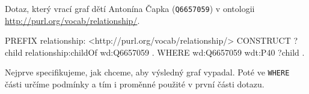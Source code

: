 \begin{prikl}
Dotaz, který vrací graf dětí Antonína Čapka (\texttt{Q6657059}) v ontologii \url{http://purl.org/vocab/relationship/}.
\begin{code}
PREFIX relationship: <http://purl.org/vocab/relationship/>
CONSTRUCT {
    ?child relationship:childOf wd:Q6657059 .
} WHERE {
    wd:Q6657059 wdt:P40 ?child .
}
\end{code}
Nejprve specifikujeme, jak chceme, aby výsledný graf vypadal. Poté ve \texttt{WHERE} části určíme podmínky a tím i proměnné použité v první části dotazu.
\end{prikl}